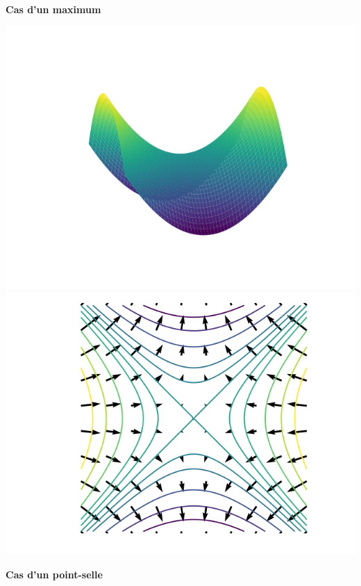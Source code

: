 \begin{center}
\begin{minipage}{0.30\textwidth}
		\quad\textbf{Cas d'un maximum}
	\end{minipage}
	\begin{minipage}{0.30\textwidth}
		\center
		\includegraphics[scale=\myscale,scale=0.35]{figures/gradient-surface-3c}\\
		
		\includegraphics[scale=\myscale,scale=0.35]{figures/gradient-surface-5c}
		
		\quad\textbf{Cas d'un point-selle}
	\end{minipage}
\end{center}






